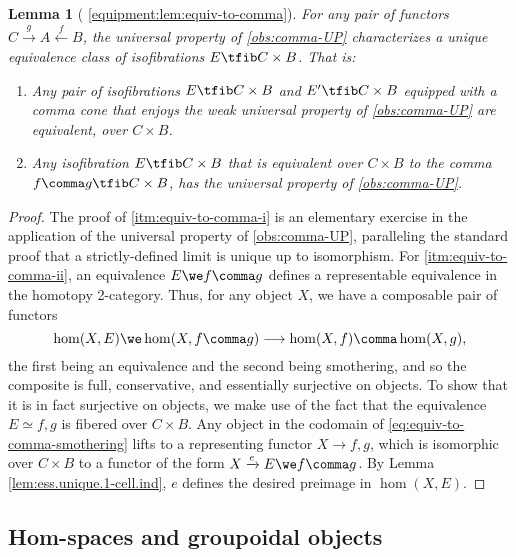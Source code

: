 \documentclass[12pt,reqno]{amsart}
\theoremstyle{plain}
\newtheorem{lem}[thm]{Lemma}
\theoremstyle{definition}
\theoremstyle{remark}
\numberwithin{equation}{subsection}
\newcommand{\extRef}[3]{%
  {\protect\IfBeginWith{#3}{itm:}{}{#2.}}\ref*{#1:#3}}
\newcommand{\refV}{\extRef{equipment}{V}}
\begin{document}
\begin{lem}[{\refV{lem:equiv-to-comma}}]\label{lem:equiv-to-comma} 
For any pair of functors $C \xrightarrow{g} A \xleftarrow{f} B$, the universal property of \ref{obs:comma-UP} characterizes a unique equivalence class of isofibrations $E \tfib C \times B$. That is:
\begin{enumerate}[label=(\roman*)]
\item\label{itm:equiv-to-comma-i} Any pair of isofibrations $E \tfib C \times B$ and $E' \tfib C \times B$ equipped with a comma cone that enjoys the weak universal property of \ref{obs:comma-UP} are equivalent, over $C \times B$.
\item\label{itm:equiv-to-comma-ii} Any isofibration $E \tfib C \times B$ that is equivalent over $C\times B$ to the comma $f \comma g \tfib C \times B$, has the universal property of \ref{obs:comma-UP}.
\end{enumerate}
\end{lem}
\begin{proof}
The proof of \ref{itm:equiv-to-comma-i} is an elementary exercise in the application of the universal property of \ref{obs:comma-UP}, paralleling the standard proof that a strictly-defined limit is unique up to isomorphism. For \ref{itm:equiv-to-comma-ii}, an equivalence $E \we f\comma g$ defines a representable equivalence in the homotopy 2-category. Thus, for any object $X$, we have a composable pair of functors
\begin{equation}\label{eq:equiv-to-comma-smothering} \hom(X,E) \we \hom(X,f \comma g) \longrightarrow \hom(X,f) \comma \hom(X,g),\end{equation} the first being an equivalence and the second being smothering, and so the composite is full, conservative, and essentially surjective on objects. To show that it is in fact surjective on objects, we make use of the fact that the equivalence $E \simeq f \comma g$ is fibered over $C \times B$. Any object in the codomain of \eqref{eq:equiv-to-comma-smothering} lifts to a representing functor $X \to f \comma g$, which is isomorphic over $C \times B$ to a functor of the form $X \xrightarrow{e} E \we f \comma g$. By Lemma \ref{lem:ess.unique.1-cell.ind}, $e$ defines the desired preimage in $\hom(X,E)$. 
\end{proof}

\subsection{Hom-spaces and groupoidal objects}
\end{document}

